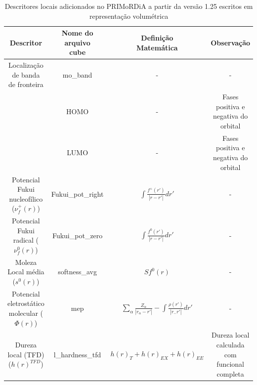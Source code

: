 \documentclass[a4paper,11pt]{refart}
\begin{document}
\hspace*{-\leftmarginwidth}
\begin{minipage}{\fullwidth}
	\begin{table}[H]
		\centering	
		\caption{Descritores locais adicionados no PRIMoRDiA a partir da versão 1.25 escritos em representação volumétrica}
		\begin{tabular}{c|c|c|c}
			\toprule
			Descritor &\makecell{Nome do\\ arquivo\\ cube}&\makecell{Definição\\Matemática}& Observação \\
			\midrule
			\makecell{Localização de banda\\de fronteira} & mo\_band & - & -  \\\hline
			\makecell{HOMO ($\phi(r)^N$) } & HOMO & - &  \makecell{Fases positiva e\\ negativa do orbital} \\\hline
			\makecell{LUMO ($\phi(r)^{N+1}$) } & LUMO & - & \makecell{Fases positiva e\\ negativa do orbital}  \\\hline
			\makecell{Potencial Fukui\\ nucleofílico ($\nu_{f}^{+}(r)$)} & Fukui\_pot\_right  & $\int \frac{f^{+}(r')}{|r - r'|}dr'$ &  - \\\hline
			\makecell{Potencial Fukui\\ radical ($\nu_{f}^{0}(r)$)} & Fukui\_pot\_zero & $\int \frac{f^{0}(r')}{|r - r'|}dr'$ & - \\\hline
			\makecell{Moleza Local \\média ($s^{0}(r)$)} & softness\_avg & $Sf^{0}(r)$ & - \\\hline
			\makecell{Potencial eletrostático\\molecular ($\Phi(r)$) } & mep & $\sum_{\alpha} \frac{Z_{\alpha}}{|r_{\alpha}-r'|}  - \int\frac{\rho(r')}{|r_-r'|}dr'$& - \\\hline
			\makecell{Dureza local \\(TFD) ($h(r)^{TFD}$)} & l\_hardness\_tfd & $h(r)_{T} + h(r)_{EX}+h(r)_{EE}$ & \makecell{Dureza local \\calculada com \\funcional completa}  \\
			\bottomrule
		\end{tabular} 
		\label{tab_local3}	
	\end{table}	
\end{minipage}
\end{document}
